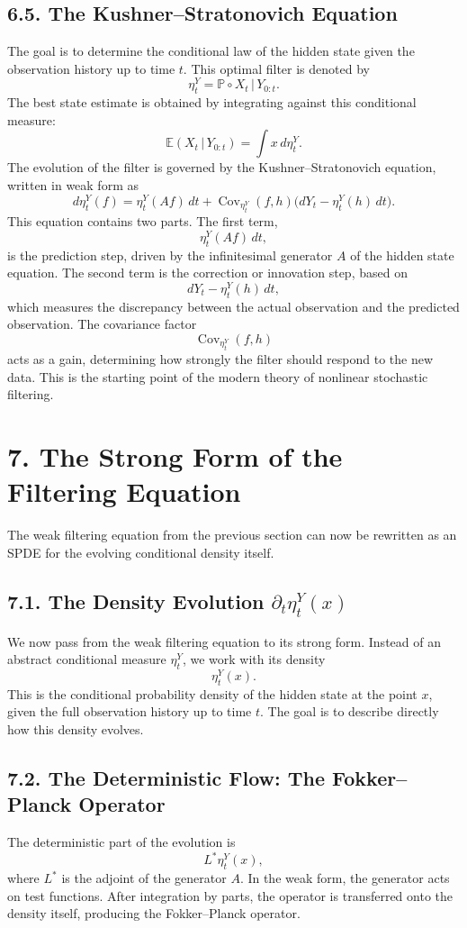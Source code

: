 \documentclass[11pt]{article}
\theoremstyle{definition}
\theoremstyle{remark}
\begin{document}
\subsection*{6.5. The Kushner--Stratonovich Equation}
The goal is to determine the conditional law of the hidden state given the observation history up to time \(t\). This optimal filter is denoted by
\[
\eta_t^Y
=
\mathbb P\circ X_t\,|\,Y_{0:t}.
\]
The best state estimate is obtained by integrating against this conditional measure:
\[
\mathbb E(X_t\,|\,Y_{0:t})
=
\int x\,d\eta_t^Y.
\]
The evolution of the filter is governed by the Kushner--Stratonovich equation, written in weak form as
\[
d\eta_t^Y(f)
=
\eta_t^Y(Af)\,dt
+
\operatorname{Cov}_{\eta_t^Y}(f,h)\bigl(dY_t-\eta_t^Y(h)\,dt\bigr).
\]
This equation contains two parts. The first term,
\[
\eta_t^Y(Af)\,dt,
\]
is the prediction step, driven by the infinitesimal generator \(A\) of the hidden state equation. The second term is the correction or innovation step, based on
\[
dY_t-\eta_t^Y(h)\,dt,
\]
which measures the discrepancy between the actual observation and the predicted observation. The covariance factor
\[
\operatorname{Cov}_{\eta_t^Y}(f,h)
\]
acts as a gain, determining how strongly the filter should respond to the new data. This is the starting point of the modern theory of nonlinear stochastic filtering.

\section*{7. The Strong Form of the Filtering Equation}
The weak filtering equation from the previous section can now be rewritten as an SPDE for the evolving conditional density itself.

\subsection*{7.1. The Density Evolution \(\partial_t\eta_t^Y(x)\)}
We now pass from the weak filtering equation to its strong form. Instead of an abstract conditional measure \(\eta_t^Y\), we work with its density
\[
\eta_t^Y(x).
\]
This is the conditional probability density of the hidden state at the point \(x\), given the full observation history up to time \(t\). The goal is to describe directly how this density evolves.

\subsection*{7.2. The Deterministic Flow: The Fokker--Planck Operator}
The deterministic part of the evolution is
\[
L^*\eta_t^Y(x),
\]
where \(L^*\) is the adjoint of the generator \(A\). In the weak form, the generator acts on test functions. After integration by parts, the operator is transferred onto the density itself, producing the Fokker--Planck operator.
\end{document}
